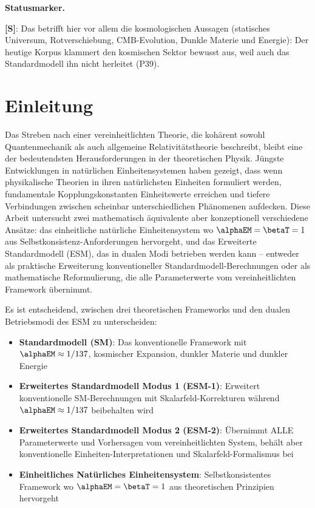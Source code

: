 	\medskip\noindent\textbf{Statusmarker.}
	

	\noindent \textbf{[S]}: Das betrifft hier vor allem die kosmologischen Aussagen (statisches Universum, Rotverschiebung, CMB-Evolution, Dunkle Materie und Energie): Der heutige Korpus klammert den kosmischen Sektor bewusst aus, weil auch das Standardmodell ihn nicht herleitet (P39).

	
	\section{Einleitung}
	\label{sec:introduction}
	
	Das Streben nach einer vereinheitlichten Theorie, die kohärent sowohl Quantenmechanik als auch allgemeine Relativitätstheorie beschreibt, bleibt eine der bedeutendsten Herausforderungen in der theoretischen Physik. Jüngste Entwicklungen in natürlichen Einheitensystemen haben gezeigt, dass wenn physikalische Theorien in ihren natürlichsten Einheiten formuliert werden, fundamentale Kopplungskonstanten Einheitswerte erreichen und tiefere Verbindungen zwischen scheinbar unterschiedlichen Phänomenen aufdecken. Diese Arbeit untersucht zwei mathematisch äquivalente aber konzeptionell verschiedene Ansätze: das einheitliche natürliche Einheitensystem wo $\alphaEM = \betaT = 1$ aus Selbstkonsistenz-Anforderungen hervorgeht, und das Erweiterte Standardmodell (ESM), das in dualen Modi betrieben werden kann – entweder als praktische Erweiterung konventioneller Standardmodell-Berechnungen oder als mathematische Reformulierung, die alle Parameterwerte vom vereinheitlichten Framework übernimmt.
	
	Es ist entscheidend, zwischen drei theoretischen Frameworks und den dualen Betriebsmodi des ESM zu unterscheiden:
	
	\begin{itemize}
		\item \textbf{Standardmodell (SM)}: Das konventionelle Framework mit $\alphaEM \approx 1/137$, kosmischer Expansion, dunkler Materie und dunkler Energie
		\item \textbf{Erweitertes Standardmodell Modus 1 (ESM-1)}: Erweitert konventionelle SM-Berechnungen mit Skalarfeld-Korrekturen während $\alphaEM \approx 1/137$ beibehalten wird
		\item \textbf{Erweitertes Standardmodell Modus 2 (ESM-2)}: Übernimmt ALLE Parameterwerte und Vorhersagen vom vereinheitlichten System, behält aber konventionelle Einheiten-Interpretationen und Skalarfeld-Formalismus bei
		\item \textbf{Einheitliches Natürliches Einheitensystem}: Selbstkonsistentes Framework wo $\alphaEM = \betaT = 1$ aus theoretischen Prinzipien hervorgeht
	\end{itemize}
	
